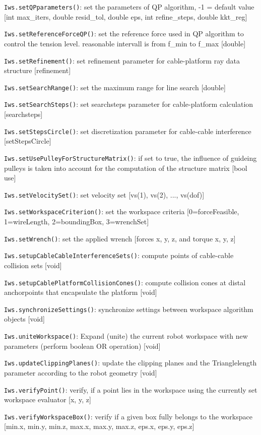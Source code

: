 \documentclass[11pt,a4paper,onepage,openany]{book}
\begin{document}
\texttt{Iws.setQPparameters()}: set the parameters of QP algorithm, -1 = default value [int max\_iters, double resid\_tol, double eps, int refine\_steps, double kkt\_reg]

\texttt{Iws.setReferenceForceQP()}: set the reference force used in QP algorithm to control the tension level. reasonable intervall is from f\_min to f\_max [double]

\texttt{Iws.setRefinement()}: set refinement parameter for cable-platform ray data structure [refinement]

\texttt{Iws.setSearchRange()}: set the maximum range for line search [double]

\texttt{Iws.setSearchSteps()}: set searchsteps parameter for cable-platform calculation [searchsteps]

\texttt{Iws.setStepsCircle()}: set discretization parameter for cable-cable interference [setStepsCircle]

\texttt{Iws.setUsePulleyForStructureMatrix()}: if set to true, the influence of guideing pulleys is taken into account for the computation of the structure matrix [bool use]

\texttt{Iws.setVelocitySet()}: set velocity set [vs(1), vs(2), ..., vs(dof)]

\texttt{Iws.setWorkspaceCriterion()}: set the workspace criteria [0=forceFeasible, 1=wireLength, 2=boundingBox, 3=wrenchSet]

\texttt{Iws.setWrench()}: set the applied wrench [forces x, y, z, and torque x, y, z]

\texttt{Iws.setupCableCableInterferenceSets()}: compute points of cable-cable collision sets [void]

\texttt{Iws.setupCablePlatformCollisionCones()}: compute collision cones at distal anchorpoints that encapsulate the platform [void]

\texttt{Iws.synchronizeSettings()}: synchronize settings between workspace algorithm objects [void]

\texttt{Iws.uniteWorkspace()}: Expand (unite) the current robot workspace with new parameters (perform boolean OR operation) [void]

\texttt{Iws.updateClippingPlanes()}: update the clipping planes and the Trianglelength parameter according to the robot geometry [void]

\texttt{Iws.verifyPoint()}: verify, if a point lies in the workspace using the currently set workspace evaluator [x, y, z]

\texttt{Iws.verifyWorkspaceBox()}: verify if a given box fully belongs to the workspace [min.x, min.y, min.z, max.x, max.y, max.z, eps.x, eps.y, eps.z]
\end{document}
